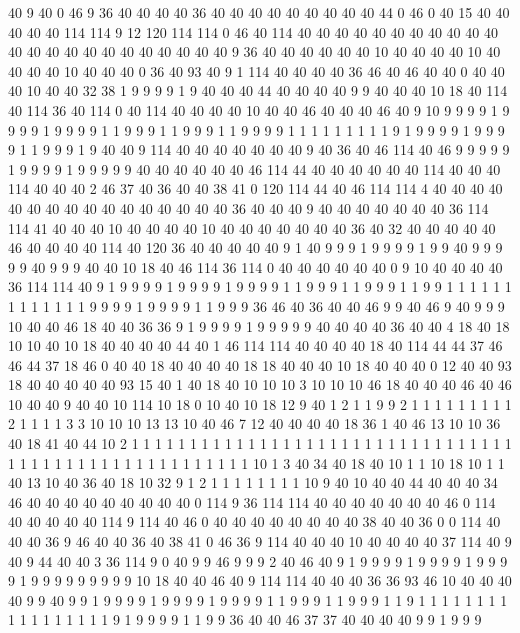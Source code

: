 40 9 40 0 46 9 36 40 40 40 40 36 40 40 40 40 40 40 40 40
40 44 0 46 0 40 15 40 40 40 40 40 114 114 9 12 120 114 114 0
46 40 114 40 40 40 40 40 40 40 40 40 40 40 40 40 40 40 40 40
40 40 40 40 40 40 9 36 40 40 40 40 40 40 10 40 40 40 40 10
40 40 40 40 10 40 40 40 0 36 40 93 40 9 1 114 40 40 40 40
36 46 40 46 40 40 0 40 40 40 10 40 40 32 38 1 9 9 9 9
1 9 40 40 40 44 40 40 40 40 9 9 40 40 40 10 18 40 114 40
114 36 40 114 0 40 114 40 40 40 40 10 40 40 46 40 40 40 46 40
9 10 9 9 9 9 1 9 9 9 9 1 9 9 9 9 1 1 9 9
9 1 1 9 9 9 1 1 9 9 9 9 1 1 1 1 1 1 1 1
1 9 1 9 9 9 9 1 9 9 9 9 1 1 9 9 9 1 9 40
40 9 114 40 40 40 40 40 40 40 9 40 36 40 46 114 40 46 9 9
9 9 9 1 9 9 9 9 1 9 9 9 9 9 40 40 40 40 40 40
46 114 44 40 40 40 40 40 40 114 40 40 40 114 40 40 40 2 46 37
40 36 40 40 38 41 0 120 114 44 40 46 114 114 4 40 40 40 40 40
40 40 40 40 40 40 40 40 40 40 40 36 40 40 40 9 40 40 40 40
40 40 40 36 114 114 41 40 40 40 10 40 40 40 40 10 40 40 40 40
40 40 40 36 40 32 40 40 40 40 40 46 40 40 40 40 114 40 120 36
40 40 40 40 40 9 1 40 9 9 9 1 9 9 9 9 1 9 9 40
9 9 9 9 9 40 9 9 9 40 40 10 18 40 46 114 36 114 0 40
40 40 40 40 40 0 9 10 40 40 40 40 36 114 114 40 9 1 9 9
9 9 1 9 9 9 9 1 9 9 9 9 1 1 9 9 9 1 1 9
9 9 1 1 9 9 1 1 1 1 1 1 1 1 1 1 1 1 1 9
9 9 9 1 9 9 9 9 1 1 9 9 9 36 46 40 36 40 40 46
9 9 40 46 9 40 9 9 9 10 40 40 46 18 40 40 36 36 9 1
9 9 9 9 1 9 9 9 9 9 40 40 40 40 36 40 40 4 18 40
18 10 10 40 10 18 40 40 40 40 44 40 1 46 114 114 40 40 40 40
18 40 114 44 44 37 46 46 44 37 18 46 0 40 40 18 40 40 40 40
18 18 40 40 40 10 18 40 40 40 0 12 40 40 93 18 40 40 40 40
40 93 15 40 1 40 18 40 10 10 10 3 10 10 10 46 18 40 40 40
46 40 46 10 40 40 9 40 40 10 114 10 18 0 10 40 10 18 12 9
40 1 2 1 1 9 9 2 1 1 1 1 1 1 1 1 1 2 1 1
1 1 3 3 10 10 10 13 13 10 40 46 7 12 40 40 40 40 18 36
1 40 46 13 10 10 36 40 18 41 40 44 10 2 1 1 1 1 1 1
1 1 1 1 1 1 1 1 1 1 1 1 1 1 1 1 1 1 1 1
1 1 1 1 1 1 1 1 1 1 1 1 1 1 1 1 1 1 1 1
1 1 1 1 1 1 1 1 10 1 3 40 34 40 18 40 10 1 1 10
18 10 1 1 40 13 10 40 36 40 18 10 32 9 1 2 1 1 1 1
1 1 1 1 10 9 40 10 40 40 44 40 40 40 34 46 40 40 40 40
40 40 40 40 40 0 114 9 36 114 114 40 40 40 40 40 40 40 46 0
114 40 40 40 40 40 114 9 114 40 46 0 40 40 40 40 40 40 40 40
38 40 40 36 0 0 114 40 40 40 36 9 46 40 40 36 40 38 41 0
46 36 9 114 40 40 40 10 40 40 40 40 37 114 40 9 40 9 44 40
40 3 36 114 9 0 40 9 9 46 9 9 9 2 40 46 40 9 1 9
9 9 9 1 9 9 9 9 1 9 9 9 9 1 9 9 9 9 9 9
9 9 9 10 18 40 40 46 40 9 114 114 40 40 40 36 36 93 46 10
40 40 40 40 9 9 40 9 9 1 9 9 9 9 1 9 9 9 9 1
9 9 9 9 1 1 9 9 9 1 1 9 9 9 1 1 9 1 1 1
1 1 1 1 1 1 1 1 1 1 1 1 1 1 9 1 9 9 9 9
1 1 9 9 36 40 40 46 37 37 40 40 40 40 9 9 1 9 9 9
